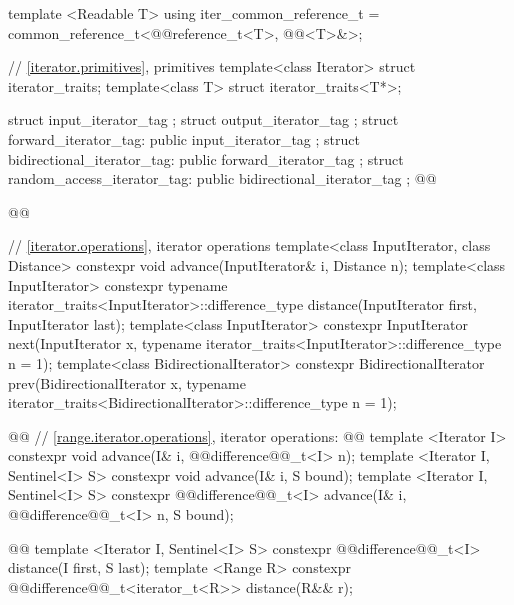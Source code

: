\begin{codeblock}
{  template <Readable T> using iter_common_reference_t
    = common_reference_t<@@reference_t<T>, @@<T>&>;

  // \ref{iterator.primitives}, primitives
  template<class Iterator> struct iterator_traits;
  template<class T> struct iterator_traits<T*>;

  struct input_iterator_tag { };
  struct output_iterator_tag { };
  struct forward_iterator_tag: public input_iterator_tag { };
  struct bidirectional_iterator_tag: public forward_iterator_tag { };
  struct random_access_iterator_tag: public bidirectional_iterator_tag { };
  @@

  @@

  // \ref{iterator.operations}, iterator operations
  template<class InputIterator, class Distance>
    constexpr void
      advance(InputIterator& i, Distance n);
  template<class InputIterator>
    constexpr typename iterator_traits<InputIterator>::difference_type
      distance(InputIterator first, InputIterator last);
  template<class InputIterator>
    constexpr InputIterator
      next(InputIterator x,
           typename iterator_traits<InputIterator>::difference_type n = 1);
  template<class BidirectionalIterator>
    constexpr BidirectionalIterator
      prev(BidirectionalIterator x,
           typename iterator_traits<BidirectionalIterator>::difference_type n = 1);

  @@
    // \ref{range.iterator.operations},  iterator operations:
    @@
    template <Iterator I>
      constexpr void advance(I& i, @@difference@@_t<I> n);
    template <Iterator I, Sentinel<I> S>
      constexpr void advance(I& i, S bound);
    template <Iterator I, Sentinel<I> S>
      constexpr @@difference@@_t<I> advance(I& i, @@difference@@_t<I> n, S bound);

    @@
    template <Iterator I, Sentinel<I> S>
      constexpr @@difference@@_t<I> distance(I first, S last);
    template <Range R>
      constexpr @@difference@@_t<iterator_t<R>> distance(R&& r);

}
\end{codeblock}
